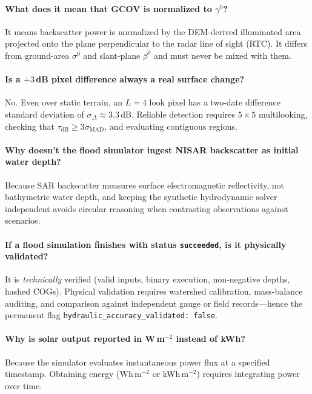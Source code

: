 \documentclass[11pt,a4paper]{article}
\begin{document}
\paragraph{What does it mean that GCOV is normalized to $\gamma^0$?}
It means backscatter power is normalized by the DEM-derived illuminated area projected onto the plane perpendicular to the radar line of sight (RTC). It differs from ground-area $\sigma^0$ and slant-plane $\beta^0$ and must never be mixed with them.

\paragraph{Is a $+3$\,dB pixel difference always a real surface change?}
No. Even over static terrain, an $L=4$ look pixel has a two-date difference standard deviation of $\sigma_\Delta\approx 3.3$\,dB. Reliable detection requires $5\times5$ multilooking, checking that $\tau_{\mathrm{dB}} \ge 3\sigma_{\mathrm{MAD}}$, and evaluating contiguous regions.

\paragraph{Why doesn't the flood simulator ingest NISAR backscatter as initial water depth?}
Because SAR backscatter measures surface electromagnetic reflectivity, not bathymetric water depth, and keeping the synthetic hydrodynamic solver independent avoids circular reasoning when contrasting observations against scenarios.

\paragraph{If a flood simulation finishes with status \texttt{succeeded}, is it physically validated?}
It is \emph{technically} verified (valid inputs, binary execution, non-negative depths, hashed COGs). Physical validation requires watershed calibration, mass-balance auditing, and comparison against independent gauge or field records---hence the permanent flag \texttt{hydraulic\_accuracy\_validated: false}.

\paragraph{Why is solar output reported in W\,m$^{-2}$ instead of kWh?}
Because the simulator evaluates instantaneous power flux at a specified timestamp. Obtaining energy (Wh\,m$^{-2}$ or kWh\,m$^{-2}$) requires integrating power over time.
\end{document}
